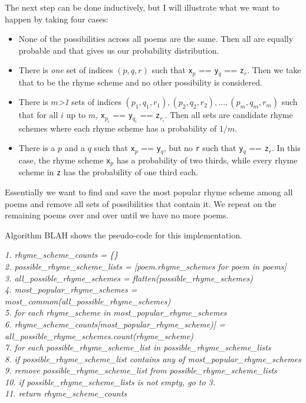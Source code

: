 The next step can be done inductively, but I will illustrate what we want to happen by taking four cases:
\begin{itemize}
\item{None of the possibilities across all poems are the same. Then all are equally probable and that gives us our probability distribution.}
\item{There is \textit{one} set of indices $(p, q, r)$ such that \texttt{x$_p$} == \texttt{y$_q$} == \texttt{z$_r$}. Then we take that to be the rhyme scheme and no other possibility is considered.}
\item{There is $m$\textit{\textgreater 1} sets of indices $(p_1, q_1, r_1), (p_2, q_2, r_2), ..., (p_m, q_m, r_m)$ such that for all $i$ up to $m$, \texttt{x$_{p_i}$} == \texttt{y$_{q_i}$} == \texttt{z$_{r_i}$}. Then all sets are candidate rhyme schemes where each rhyme scheme has a probability of $1/m$.}
\item{There is a $p$ and a $q$ such that \texttt{x$_p$} == \texttt{y$_q$}, but no \texttt{r} such that \texttt{y$_q$} == \texttt{z$_r$}. In this case, the rhyme scheme \texttt{x$_p$} has a probability of two thirds, while every rhyme scheme in \texttt{z} has the probability of one third each.}
\end{itemize}

Essentially we want to find and save the most popular rhyme scheme among all poems and remove all sets of possibilities that contain it. We repeat on the remaining poems over and over until we have no more poems. 

Algorithm BLAH shows the pseudo-code for this implementation.

\textit{
 1. rhyme\_scheme\_counts = \{\}\\
 2. possible\_rhyme\_scheme\_lists = [poem.rhyme\_schemes for poem in poems]\\
 3. all\_possible\_rhyme\_schemes = flatten(possible\_rhyme\_schemes)\\
 4. most\_popular\_rhyme\_schemes = most\_common(all\_possible\_rhyme\_schemes)\\
 5. for each rhyme\_scheme in most\_popular\_rhyme\_schemes\\
 6. 		rhyme\_scheme\_counts[most\_popular\_rhyme\_scheme)] = all\_possible\_rhyme\_schemes.count(rhyme\_scheme)\\
 7. for each possible\_rhyme\_scheme\_list in possible\_rhyme\_scheme\_lists\\
 8.		if possible\_rhyme\_scheme\_list contains any of  most\_popular\_rhyme\_schemes\\
 9.			remove possible\_rhyme\_scheme\_list from possible\_rhyme\_scheme\_lists\\
10. if possible\_rhyme\_scheme\_lists is not empty, go to 3.\\
11. return rhyme\_scheme\_counts\\
}

